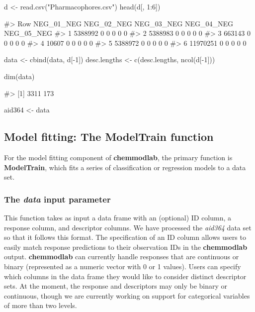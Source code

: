 \begin{Schunk}
\begin{Sinput}
d <- read.csv("Pharmacophores.csv")
head(d[, 1:6])
\end{Sinput}
\begin{Soutput}
#>        Row NEG_01_NEG NEG_02_NEG NEG_03_NEG NEG_04_NEG NEG_05_NEG
#> 1  5388992          0          0          0          0          0
#> 2  5388983          0          0          0          0          0
#> 3   663143          0          0          0          0          0
#> 4    10607          0          0          0          0          0
#> 5  5388972          0          0          0          0          0
#> 6 11970251          0          0          0          0          0
\end{Soutput}
\begin{Sinput}
data <- cbind(data, d[-1])
desc.lengths <- c(desc.lengths, ncol(d[-1]))

dim(data)
\end{Sinput}
\begin{Soutput}
#> [1] 3311  173
\end{Soutput}
\begin{Sinput}
aid364 <- data
\end{Sinput}
\end{Schunk}

\subsection{\texorpdfstring{Model fitting: The \textbf{ModelTrain}
function}{Model fitting: The ModelTrain function}}\label{model-fitting-the-modeltrain-function}

For the model fitting component of \textbf{chemmodlab}, the primary
function is \textbf{ModelTrain}, which fits a series of classification
or regression models to a data set.

\subsubsection{\texorpdfstring{The \textit{data} input
parameter}{The  input parameter}}\label{the-input-parameter}

This function takes as input a data frame with an (optional) ID column,
a response column, and descriptor columns. We have processed the
\emph{aid364} data set so that it follows this format. The specification
of an ID column allows users to easily match response predictions to
their observation IDs in the \textbf{chemmodlab} output.
\textbf{chemmodlab} can currently handle responses that are continuous
or binary (represented as a numeric vector with 0 or 1 values). Users
can specify which columns in the data frame they would like to consider
distinct descriptor sets. At the moment, the response and descriptors
may only be binary or continuous, though we are currently working on
support for categorical variables of more than two levels.

